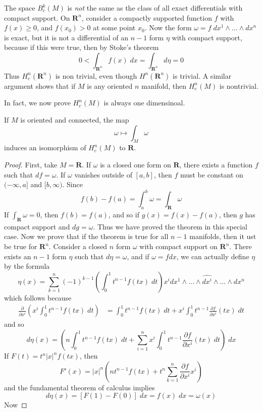 \begin{example}
    The space $B^k_c(M)$ is {\it not} the same as the class of all exact differentials with compact support. On $\mathbf{R}^n$, consider a compactly supported function $f$ with $f(x) \geq 0$, and $f(x_0) > 0$ at some point $x_0$. Now the form $\omega = f\; dx^1 \wedge \dots \wedge dx^n$ is exact, but it is not a differential of an $n-1$ form $\eta$ with compact support, because if this were true, then by Stoke's theorem
    \[ 0 < \int_{\mathbf{R}^n} f(x)\; dx = \int_{\mathbf{R}^n} d\eta = 0 \]
    Thus $H^n_c(\mathbf{R}^n)$ is non trivial, even though $H^n(\mathbf{R}^n)$ is trivial. A similar argument shows that if $M$ is any oriented $n$ manifold, then $H^n_c(M)$ is nontrivial.
\end{example}

In fact, we now prove $H^n_c(M)$ is always one dimensinoal.

\begin{theorem}
    If $M$ is oriented and connected, the map
    \[ \omega \mapsto \int_M \omega \]
    induces an isomorphism of $H^n_c(M)$ to $\mathbf{R}$.
\end{theorem}
\begin{proof}
    First, take $M = \mathbf{R}$. If $\omega$ is a closed one form on $\mathbf{R}$, there exists a function $f$ such that $df = \omega$. If $\omega$ vanishes outside of $[a,b]$, then $f$ must be constant on $(-\infty,a]$ and $[b,\infty)$. Since
    \[ f(b) - f(a) = \int_a^b \omega = \int_{\mathbf{R}} \omega \]
    If $\int_{\mathbf{R}} \omega = 0$, then $f(b) = f(a)$, and so if $g(x) = f(x) - f(a)$, then $g$ has compact support and $dg = \omega$. Thus we have proved the theorem in this special case. Now we prove that if the theorem is true for all $n-1$ manifolds, then it ust be true for $\mathbf{R}^n$. Consider a closed $n$ form $\omega$ with compact support on $\mathbf{R}^n$. There exists an $n-1$ form $\eta$ such that $d\eta = \omega$, and if $\omega = f dx$, we can actually define $\eta$ by the formula
    \[ \eta(x) = \sum_{k = 1}^n (-1)^{k-1} \left( \int_0^1 t^{n-1} f(tx)\; dt \right) x^i dx^1 \wedge \dots \wedge \widehat{dx^i} \wedge \dots \wedge dx^n \]
    which follows because
    \begin{align*}
        \frac{\partial}{\partial x^i} \left( x^i \int_0^1 t^{n-1} f(tx)\; dt \right) &= \int_0^1 t^{n-1} f(tx)\; dt + x^i \int_0^1 t^{n-1} \frac{\partial f}{\partial x^i}(tx)\; dt
    \end{align*}
    and so
    \[ d\eta(x) = \left( n \int_0^1 t^{n-1} f(tx)\; dt + \sum_{i = 1}^n x^i \int_0^1 t^{n-1} \frac{\partial f}{\partial x^i}(tx)\; dt \right) \; dx \]
    If $F(t) = t^n |x|^n f(tx)$, then
    \[ F'(x) = |x|^n \left(n t^{n-1} f(tx) + t^n \sum_{k = 1}^n \frac{\partial f}{\partial x^i} x^i \right) \]
    and the fundamental theorem of calculus implies
    \[ d\eta(x) = [F(1) - F(0)]\; dx = f(x)\; dx = \omega(x) \]
    Now 
\end{proof}


